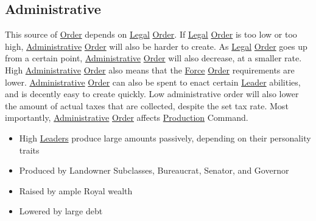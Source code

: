 \documentclass[11pt]{article}
\begin{document}
\subsection{Administrative \label{org6e4ede0} \label{orgcb9c8fe}}
\label{sec:org7774948}
This source of \hyperref[orgd146db7]{Order} depends on \hyperref[org39099d7]{Legal} \hyperref[orgd146db7]{Order}. If \hyperref[org39099d7]{Legal} \hyperref[orgd146db7]{Order} is too low or too high, \hyperref[org6e4ede0]{Administrative} \hyperref[orgd146db7]{Order} will also be harder to create. As \hyperref[org39099d7]{Legal} \hyperref[orgd146db7]{Order} goes up from a certain point, \hyperref[org6e4ede0]{Administrative} \hyperref[orgd146db7]{Order} will also decrease, at a smaller rate. High \hyperref[org6e4ede0]{Administrative} \hyperref[orgd146db7]{Order} also means that the \hyperref[org3090cf7]{Force} \hyperref[orgd146db7]{Order} requirements are lower. \hyperref[org6e4ede0]{Administrative} \hyperref[orgd146db7]{Order} can also be spent to enact certain \hyperref[org990bdda]{Leader} abilities, and is decently easy to create quickly. Low administrative order will also lower the amount of actual taxes that are collected, despite the set tax rate. Most importantly, \hyperref[org6e4ede0]{Administrative} \hyperref[orgd146db7]{Order} affects \hyperref[org9bdc7c2]{Production} Command.\\
\begin{itemize}
\item High \hyperref[org841e9de]{Leaders} produce large amounts passively, depending on their personality traits\\
\item Produced by Landowner Subclasses, Bureaucrat, Senator, and Governor\\
\item Raised by ample Royal wealth\\
\item Lowered by large debt\\
\end{itemize}
\end{document}

